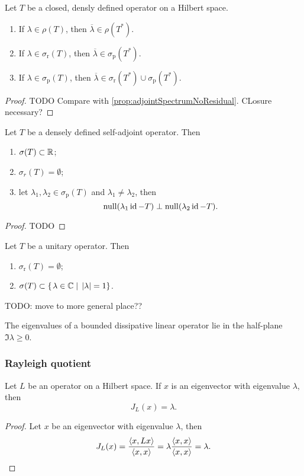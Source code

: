 \begin{proposition}
Let $T$ be a closed, densly defined operator on a Hilbert space.
\begin{enumerate}
\item If $\lambda\in\rho(T)$, then $\overline{\lambda}\in\rho(T^*)$.
\item If $\lambda\in\sigma_\text{r}(T)$, then $\overline{\lambda}\in\sigma_\text{p}(T^*)$.
\item If $\lambda\in\sigma_\text{p}(T)$, then $\overline{\lambda}\in\sigma_\text{r}(T^*)\cup\sigma_\text{p}(T^*)$.
\end{enumerate}
\end{proposition}
\begin{proof}
TODO Compare with \ref{prop:adjointSpectrumNoResidual}. CLosure necessary?
\end{proof}

\begin{proposition}
Let $T$ be a densely defined self-adjoint operator. Then
\begin{enumerate}
\item $\sigma(T) \subset \mathbb{R}$;
\item $\sigma_r(T) = \emptyset$;
\item let $\lambda_1,\lambda_2 \in \sigma_\text{p}(T)$ and $\lambda_1\neq \lambda_2$, then 
\[ \operatorname{null}(\lambda_1\operatorname{id} - T) \perp \operatorname{null}(\lambda_2 \operatorname{id} - T). \]
\end{enumerate}
\end{proposition}
\begin{proof}
TODO
\end{proof}

\begin{proposition}
Let $T$ be a unitary operator. Then
\begin{enumerate}
\item $\sigma_\text{r}(T) = \emptyset$;
\item $\sigma(T) \subset \left\{\left. \lambda\in\mathbb{C} \;\right|\; |\lambda| = 1 \right\}$.
\end{enumerate}
\end{proposition}
TODO: move to more general place??

\begin{lemma}
The eigenvalues of a bounded dissipative linear operator
lie in the half-plane $\Im\lambda \geq 0$.
\end{lemma}

\subsubsection{Rayleigh quotient}
\begin{lemma}
Let $L$ be an operator on a Hilbert space. If $x$ is an eigenvector with eigenvalue $\lambda$, then
\[ J_L(x) = \lambda. \]
\end{lemma}
\begin{proof}
Let $x$ be an eigenvector with eigenvalue $\lambda$, then
\[ J_L(x) = \frac{\left\langle x,Lx \right\rangle}{\left\langle x,x \right\rangle} = \lambda \frac{\left\langle x,x \right\rangle}{\left\langle x,x \right\rangle} = \lambda. \]
\end{proof}

